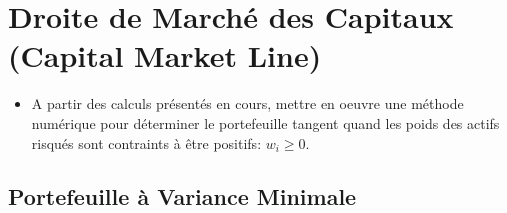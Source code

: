 \documentclass[
]{article}
\providecommand{\tightlist}{%
  \setlength{\itemsep}{0pt}\setlength{\parskip}{0pt}}
\begin{document}
\begin{table}

\caption{\label{tab:unnamed-chunk-3}Corrélation des rendements quotidiens}
\centering
{}
\end{table}

\hypertarget{droite-de-marchuxe9-des-capitaux-capital-market-line}{%
\section{Droite de Marché des Capitaux (Capital Market
Line)}\label{droite-de-marchuxe9-des-capitaux-capital-market-line}}

\begin{itemize}
\tightlist
\item
  A partir des calculs présentés en cours, mettre en oeuvre une méthode
  numérique pour déterminer le portefeuille tangent quand les poids des
  actifs risqués sont contraints à être positifs: \(w_i \ge 0\).
\end{itemize}

\hypertarget{portefeuille-uxe0-variance-minimale}{%
\subsection{Portefeuille à Variance
Minimale}\label{portefeuille-uxe0-variance-minimale}}
\end{document}
